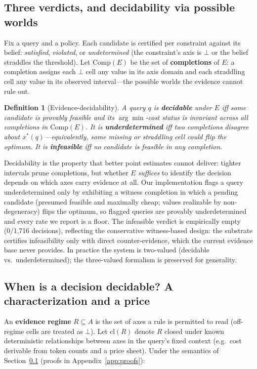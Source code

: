\documentclass{article} %
\newtheorem{definition}{Definition}
\newcommand{\cl}{\mathrm{cl}}
\newcommand{\Comp}{\mathrm{Comp}}
\newcommand{\bbot}{\bot}
\begin{document}
\subsection{Three verdicts, and decidability via possible worlds}
\label{sec:decidability}

Fix a query and a policy. Each candidate is certified per constraint against its belief: \emph{satisfied}, \emph{violated}, or \emph{undetermined} (the constraint's axis is $\bbot$ or the belief straddles the threshold). Let $\Comp(E)$ be the set of \textbf{completions} of $E$: a completion assigns each $\bbot$ cell any value in its axis domain and each straddling cell any value in its observed interval---the possible worlds the evidence cannot rule out.

\begin{definition}[Evidence-decidability]
A query $q$ is \textbf{decidable} under $E$ iff some candidate is provably feasible and its $\arg\min$-cost status is invariant across all completions in $\Comp(E)$. It is \textbf{underdetermined} iff two completions disagree about $x^*(q)$---equivalently, some missing or straddling cell could flip the optimum. It is \textbf{infeasible} iff no candidate is feasible in any completion.
\end{definition}

Decidability is the property that better point estimates cannot deliver: tighter intervals prune completions, but whether $E$ \emph{suffices} to identify the decision depends on which axes carry evidence at all. Our implementation flags a query underdetermined only by exhibiting a witness completion in which a pending candidate (presumed feasible and maximally cheap; values realizable by non-degeneracy) flips the optimum, so flagged queries are provably underdetermined and every rate we report is a floor. The infeasible verdict is empirically empty (0/1{,}716 decisions), reflecting the conservative witness-based design: the substrate certifies infeasibility only with direct counter-evidence, which the current evidence base never provides. In practice the system is two-valued (decidable vs.\ underdetermined); the three-valued formalism is preserved for generality.

\subsection{When is a decision decidable? A characterization and a price}
\label{sec:theory}

An \textbf{evidence regime} $R \subseteq A$ is the set of axes a rule is permitted to read (off-regime cells are treated as $\bbot$). Let $\cl(R)$ denote $R$ closed under known deterministic relationships between axes in the query's fixed context (e.g.\ cost derivable from token counts and a price sheet). Under the semantics of Section~\ref{sec:decidability} (proofs in Appendix~\ref{app:proofs}):
\end{document}
